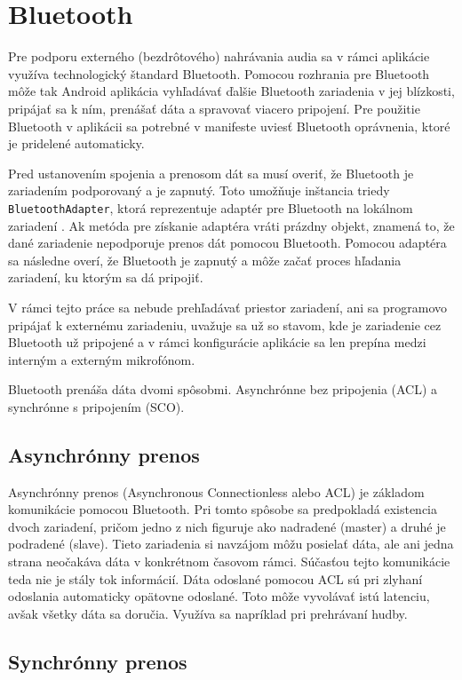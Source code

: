 \section{Bluetooth}
\label{bluetooth}

Pre podporu externého (bezdrôtového) nahrávania audia sa v rámci aplikácie využíva technologický štandard Bluetooth. Pomocou rozhrania pre Bluetooth môže tak Android aplikácia vyhľadávať ďalšie Bluetooth zariadenia v jej blízkosti, pripájať sa k ním, prenášať dáta a spravovať viacero pripojení. Pre použitie Bluetooth v aplikácii sa potrebné v manifeste uviesť Bluetooth oprávnenia, ktoré je pridelené automaticky. 

Pred ustanovením spojenia a prenosom dát sa musí overiť, že Bluetooth je zariadením podporovaný a je zapnutý. Toto umožňuje inštancia triedy \texttt{BluetoothAdapter}, ktorá reprezentuje adaptér pre Bluetooth na lokálnom zariadení\protect\footnotemark
. Ak metóda pre získanie adaptéra vráti prázdny objekt, znamená to, že dané zariadenie nepodporuje prenos dát pomocou Bluetooth. Pomocou adaptéra sa následne overí, že Bluetooth je zapnutý a môže začať proces hľadania zariadení, ku ktorým sa dá pripojiť.

V rámci tejto práce sa nebude prehľadávať priestor zariadení, ani sa programovo pripájať k externému zariadeniu, uvažuje sa už so stavom, kde je zariadenie cez Bluetooth už pripojené a v rámci konfigurácie aplikácie sa len prepína medzi interným a externým mikrofónom. 

Bluetooth prenáša dáta dvomi spôsobmi. Asynchrónne bez pripojenia (ACL) a synchrónne s pripojením (SCO).

\subsection*{Asynchrónny prenos}

Asynchrónny prenos (Asynchronous Connectionless alebo ACL) je základom komunikácie pomocou Bluetooth. Pri tomto spôsobe sa predpokladá existencia dvoch zariadení, pričom jedno z nich figuruje ako nadradené (master) a druhé je podradené (slave). Tieto zariadenia si navzájom môžu posielať dáta, ale ani jedna strana neočakáva dáta v konkrétnom časovom rámci. Súčasťou tejto komunikácie teda nie je stály tok informácií. Dáta odoslané pomocou ACL sú pri zlyhaní odoslania automaticky opätovne odoslané. Toto môže vyvolávať istú latenciu, avšak všetky dáta sa doručia. Využíva sa napríklad pri prehrávaní hudby.

\subsection*{Synchrónny prenos}

